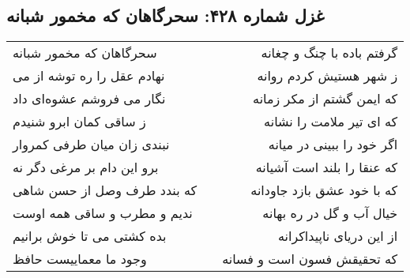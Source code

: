 \begin{center}
\section*{غزل شماره ۴۲۸: سحرگاهان که مخمور شبانه}
\label{sec:sh428}
\begin{longtable}{l p{0.5cm} r}
سحرگاهان که مخمور شبانه
&&
گرفتم باده با چنگ و چغانه
\\
نهادم عقل را ره توشه از می
&&
ز شهر هستیش کردم روانه
\\
نگار می فروشم عشوه‌ای داد
&&
که ایمن گشتم از مکر زمانه
\\
ز ساقی کمان ابرو شنیدم
&&
که ای تیر ملامت را نشانه
\\
نبندی زان میان طرفی کمروار
&&
اگر خود را ببینی در میانه
\\
برو این دام بر مرغی دگر نه
&&
که عنقا را بلند است آشیانه
\\
که بندد طرف وصل از حسن شاهی
&&
که با خود عشق بازد جاودانه
\\
ندیم و مطرب و ساقی همه اوست
&&
خیال آب و گل در ره بهانه
\\
بده کشتی می تا خوش برانیم
&&
از این دریای ناپیداکرانه
\\
وجود ما معماییست حافظ
&&
که تحقیقش فسون است و فسانه
\\
\end{longtable}
\end{center}
